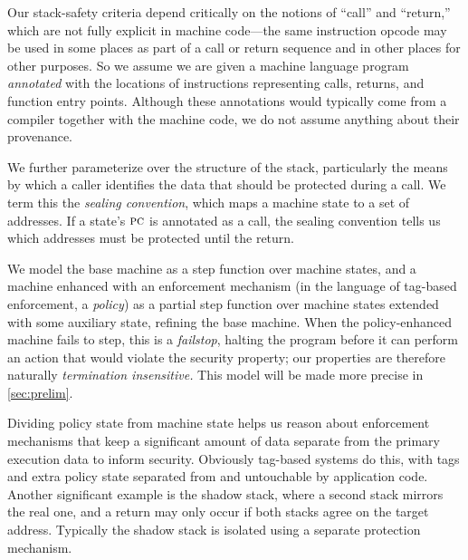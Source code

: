 \documentclass[acmsmall,review,anonymous]{acmart}\settopmatter{printfolios=true,printccs=false,printacmref=false}
\begin{document}
Our stack-safety criteria depend
critically on the notions of ``call'' and ``return,'' which are not fully explicit
in machine code---the same instruction opcode may be used in some places as part of
a call or return sequence and in other places for other purposes.
%
So we assume we are given a machine language program {\em annotated} with the locations of
instructions representing calls, returns, and function entry points. Although these
annotations would typically come from a compiler together with the machine code,
we do not assume anything about their provenance.

We further parameterize over the structure of the stack, particularly the means by
which a caller identifies the data that should be protected during a call. We term
this the {\em sealing convention}, which maps a machine state to a set of addresses.
If a state's \(\textsc{pc}\) is annotated as a call, the sealing convention tells us
which addresses must be protected until the return.

We model the base machine as a step function over machine states, and a machine
enhanced with an enforcement mechanism (in the language of tag-based enforcement,
a {\em policy}) as a partial step function over machine states extended with some
auxiliary state, refining the base machine. When the policy-enhanced machine fails
to step, this is a {\em failstop}, halting the program before it can perform an
action that would violate the security property;
our properties are therefore naturally \emph{termination insensitive.}
This model will be made more precise in \cref{sec:prelim}.

Dividing policy state from machine state helps us reason about
enforcement mechanisms that keep a significant amount of data separate from the
primary execution data to inform security. Obviously tag-based systems do this,
with tags and extra policy state separated from and untouchable by application code.
Another significant example is the shadow stack, where a second stack
mirrors the real one, and a return may only occur if both stacks agree on the
target address. Typically the shadow stack is isolated using a separate protection
mechanism.
\end{document}
